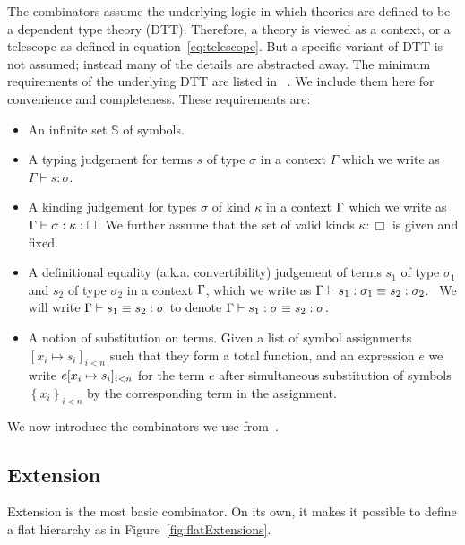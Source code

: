The combinators assume the underlying logic in which theories are defined to be a dependent type theory (DTT). Therefore, a theory is viewed as a context, or a telescope as defined in equation~\ref{eq:telescope}. But a specific variant of DTT is not assumed; instead many of the details are abstracted away. The minimum requirements of the underlying DTT are listed in ~\cite{carette2018building}. We include them here for convenience and completeness. These requirements are:  
\begin{itemize}
    \item An infinite set $\mathbb{S}$ of symbols.
    
    \item A typing judgement for terms $s$ of type $\sigma$ in a context
    $\Gamma$ which we write as $\Gamma \vdash s : \sigma$.
    
    \item A kinding judgement for types $\sigma$ of kind $\kappa$ in a context
    $\Gamma$ which we write as \\
    $\Gamma \vdash \sigma : \kappa : \Box$.  We further assume that the set
    of valid kinds $\kappa : \Box$ is given and fixed.
    
    \item A definitional equality (a.k.a. convertibility) judgement of terms
    $s_1$ of type $\sigma_1$ and $s_2$ of type $\sigma_2$ in a context $\Gamma$,
    which we write as $\Gamma \vdash s_1 : \sigma_1 \equiv s_2 : \sigma_2$. \ We
    will write $\Gamma \vdash s_1 \equiv s_2 : \sigma$ to denote $\Gamma \vdash
    s_1 : \sigma \equiv s_2 : \sigma$.
    
    \item A notion of substitution on terms. Given a list of symbol
    assignments $[x_i \mapsto s_i]_{i < n}$ such that they form a total function, 
    and an expression $e$ we write $e[ x_i \mapsto s_i ]_{i < n}$
    for the term $e$ after simultaneous substitution of symbols $\left\{ x_i
    \right\}_{i < n}$ by the corresponding term in the assignment.
\end{itemize}

We now introduce the combinators we use from~\cite{carette2018building}.  
\subsection{Extension} 
\label{subsec:extension}
Extension is the most basic combinator. On its own, it makes it possible to define a flat hierarchy as in Figure~\ref{fig:flatExtensions}. 

